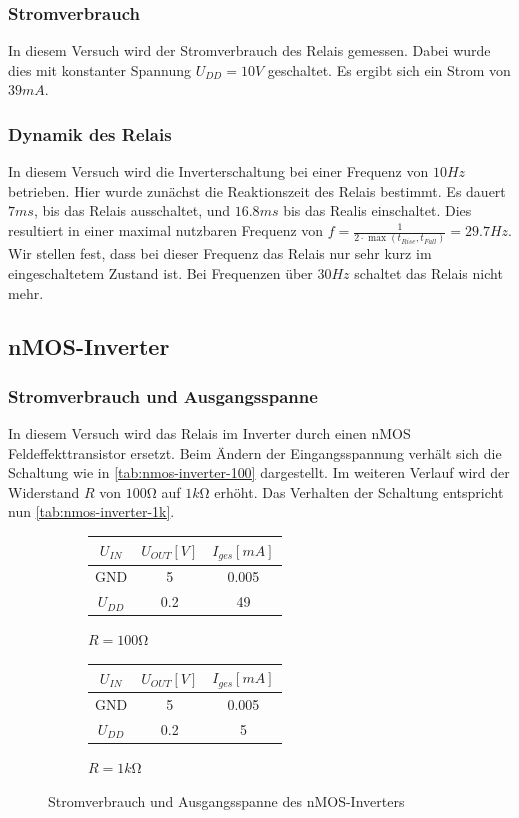 \documentclass[a4paper]{article}
\newcommand{\ma}{\si{mA}}
\newcommand{\trise}{t_\textit{Rise}}
\newcommand{\tfall}{t_\textit{Fall}}
\newcommand{\stromverbrauchtable}[4]{
    \begin{tabular}{S|S|S}
        {$U_{IN}$} & {$U_{OUT}[V]$} & {$I_{ges}[mA]$}\\
        \hline
        {GND} & #1 & #2\\
        {$U_{DD}$} & #3 & #4
    \end{tabular}
}
\begin{document}
\subsubsection{Stromverbrauch}
In diesem Versuch wird der Stromverbrauch des Relais gemessen. Dabei wurde dies mit konstanter Spannung $U_{DD}=10\si{V}$ geschaltet. Es ergibt sich ein Strom von $39\ma$.

\subsubsection{Dynamik des Relais}
In diesem Versuch wird die Inverterschaltung bei einer Frequenz von $10\si{Hz}$ betrieben.
Hier wurde zunächst die Reaktionszeit des Relais bestimmt.
Es dauert $7\si{ms}$, bis das Relais ausschaltet, und $16.8\si{ms}$ bis das Realis einschaltet. Dies resultiert in einer maximal nutzbaren Frequenz von $f=\frac{1}{2\cdot \max(\trise, \tfall)}=29.7\si{Hz}$. Wir stellen fest, dass bei dieser Frequenz das Relais nur sehr kurz im eingeschaltetem Zustand ist. Bei Frequenzen über $30\si{Hz}$ schaltet das Relais nicht mehr.


\subsection{nMOS-Inverter}
\subsubsection{Stromverbrauch und Ausgangsspanne}
In diesem Versuch wird das Relais im Inverter durch einen nMOS Feldeffekttransistor ersetzt.
Beim Ändern der Eingangsspannung verhält sich die Schaltung wie in \autoref{tab:nmos-inverter-100} dargestellt.
Im weiteren Verlauf wird der Widerstand $R$ von $100\si{\ohm}$ auf $1\si{k\ohm}$ erhöht. Das Verhalten der Schaltung entspricht nun \autoref{tab:nmos-inverter-1k}.

\begin{figure}[H]
    \centering
    \begin{subfigure}{0.5\textwidth}
        \centering
        \stromverbrauchtable{5}{0.005}{0.2}{49}
        \caption{$R=100\si{\ohm}$}
        \label{tab:nmos-inverter-100}
    \end{subfigure}%
    \begin{subfigure}{0.5\textwidth}
        \centering
        \stromverbrauchtable{5}{0.005}{0.2}{5}
        \caption{$R=1\si{k\ohm}$}
        \label{tab:nmos-inverter-1k}
    \end{subfigure}
    \caption{Stromverbrauch und Ausgangsspanne des nMOS-Inverters}
    \label{fig:nmos-inverter}
\end{figure}
\end{document}
